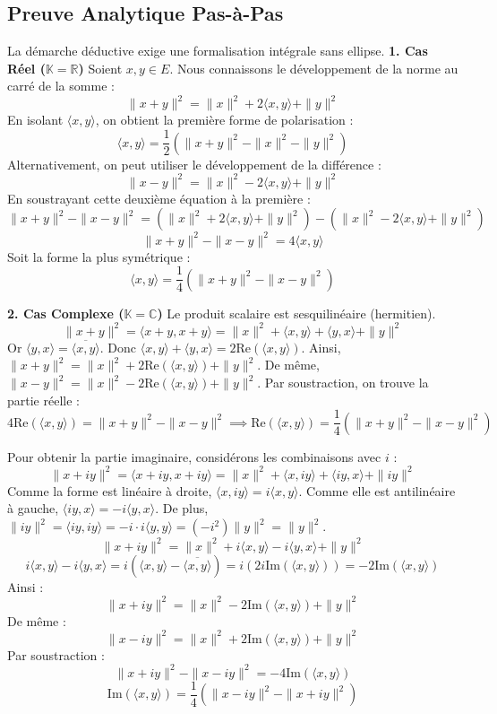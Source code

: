 \documentclass[11pt,a4paper]{report}
\begin{document}
\subsection*{Preuve Analytique Pas-à-Pas}
La démarche déductive exige une formalisation intégrale sans ellipse.
\textbf{1. Cas Réel ($\mathbb{K} = \mathbb{R}$)}
Soient $x, y \in E$. Nous connaissons le développement de la norme au carré de la somme :
$$\|x + y\|^2 = \|x\|^2 + 2\langle x, y \rangle + \|y\|^2$$
En isolant $\langle x, y \rangle$, on obtient la première forme de polarisation :
$$\langle x, y \rangle = \frac{1}{2} \left( \|x + y\|^2 - \|x\|^2 - \|y\|^2 \right)$$
Alternativement, on peut utiliser le développement de la différence :
$$\|x - y\|^2 = \|x\|^2 - 2\langle x, y \rangle + \|y\|^2$$
En soustrayant cette deuxième équation à la première :
$$\|x + y\|^2 - \|x - y\|^2 = (\|x\|^2 + 2\langle x, y \rangle + \|y\|^2) - (\|x\|^2 - 2\langle x, y \rangle + \|y\|^2)$$
$$\|x + y\|^2 - \|x - y\|^2 = 4\langle x, y \rangle$$
Soit la forme la plus symétrique :
$$\langle x, y \rangle = \frac{1}{4} \left( \|x + y\|^2 - \|x - y\|^2 \right)$$

\textbf{2. Cas Complexe ($\mathbb{K} = \mathbb{C}$)}
Le produit scalaire est sesquilinéaire (hermitien).
$$\|x + y\|^2 = \langle x+y, x+y \rangle = \|x\|^2 + \langle x, y \rangle + \langle y, x \rangle + \|y\|^2$$
Or $\langle y, x \rangle = \overline{\langle x, y \rangle}$. Donc $\langle x, y \rangle + \langle y, x \rangle = 2 \text{Re}(\langle x, y \rangle)$.
Ainsi, $\|x + y\|^2 = \|x\|^2 + 2\text{Re}(\langle x, y \rangle) + \|y\|^2$.
De même, $\|x - y\|^2 = \|x\|^2 - 2\text{Re}(\langle x, y \rangle) + \|y\|^2$.
Par soustraction, on trouve la partie réelle :
$$4\text{Re}(\langle x, y \rangle) = \|x + y\|^2 - \|x - y\|^2 \implies \text{Re}(\langle x, y \rangle) = \frac{1}{4} (\|x + y\|^2 - \|x - y\|^2)$$

Pour obtenir la partie imaginaire, considérons les combinaisons avec $i$ :
$$\|x + iy\|^2 = \langle x+iy, x+iy \rangle = \|x\|^2 + \langle x, iy \rangle + \langle iy, x \rangle + \|iy\|^2$$
Comme la forme est linéaire à droite, $\langle x, iy \rangle = i\langle x, y \rangle$.
Comme elle est antilinéaire à gauche, $\langle iy, x \rangle = -i\langle y, x \rangle$.
De plus, $\|iy\|^2 = \langle iy, iy \rangle = -i \cdot i \langle y, y \rangle = (-i^2) \|y\|^2 = \|y\|^2$.
$$\|x + iy\|^2 = \|x\|^2 + i\langle x, y \rangle - i\langle y, x \rangle + \|y\|^2$$
$$i\langle x, y \rangle - i\langle y, x \rangle = i(\langle x, y \rangle - \overline{\langle x, y \rangle}) = i(2i \text{Im}(\langle x, y \rangle)) = -2\text{Im}(\langle x, y \rangle)$$
Ainsi :
$$\|x + iy\|^2 = \|x\|^2 - 2\text{Im}(\langle x, y \rangle) + \|y\|^2$$
De même :
$$\|x - iy\|^2 = \|x\|^2 + 2\text{Im}(\langle x, y \rangle) + \|y\|^2$$
Par soustraction :
$$\|x + iy\|^2 - \|x - iy\|^2 = -4\text{Im}(\langle x, y \rangle)$$
$$\text{Im}(\langle x, y \rangle) = \frac{1}{4} (\|x - iy\|^2 - \|x + iy\|^2)$$
\end{document}
